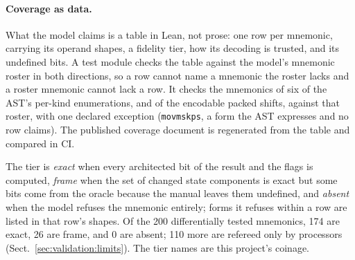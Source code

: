 \documentclass[runningheads]{llncs}
\newcommand{\src}[1]{}  %
\begin{document}
\paragraph{Coverage as data.}
What the model claims is a table in Lean, not prose: one row per mnemonic, carrying its operand shapes,
a fidelity tier, how its decoding is trusted, and its undefined bits. A test module checks the table
against the model's mnemonic roster in both directions, so a row cannot name a mnemonic the roster lacks and
a roster mnemonic cannot lack a row. It checks the mnemonics of six of the AST's per-kind enumerations, and
of the encodable packed shifts, against that roster, with one declared exception (\texttt{movmskps}, a form
the AST expresses and no row claims). The published coverage document is regenerated from the table and
compared in CI.
\src{X86/Coverage.lean module docstring; Tests/Coverage.lean table\_mnemonics\_subset\_roster,
roster\_covered\_by\_table, kind\_mnemonics\_are\_named\_or\_declared, declaredUnclaimedKindMnemonics,
vshift\_roster\_names\_exactly\_the\_encodable\_pairs; .github/workflows/ci.yml, the COVERAGE.md regeneration check}
The tier is \emph{exact} when every architected bit of the result and the flags is computed,
\emph{frame} when the set of changed state components is exact but some bits come from the oracle
because the manual leaves them undefined, and \emph{absent} when the model refuses the mnemonic entirely; forms it refuses within a row are
listed in that row's shapes. Of the 200 differentially tested mnemonics, 174 are exact, 26 are frame, and 0 are absent; 110 more are refereed only by processors (Sect.~\ref{sec:validation:limits}). The tier names are this project's coinage.
\src{X86/Coverage.lean inductive Tier; Tests/Coverage.lean table\_mnemonics\_subset\_roster and roster\_covered\_by\_table compare mnemonic
lists; refused forms inside non-absent rows: docs/COVERAGE.md bswap, shld, bt (D250); docs/COVERAGE.md:13; docs/CLAIMS.tsv[coverage\_mnemonics, tier\_exact, tier\_frame,
tier\_absent, silicon\_mnemonics]}
\end{document}

